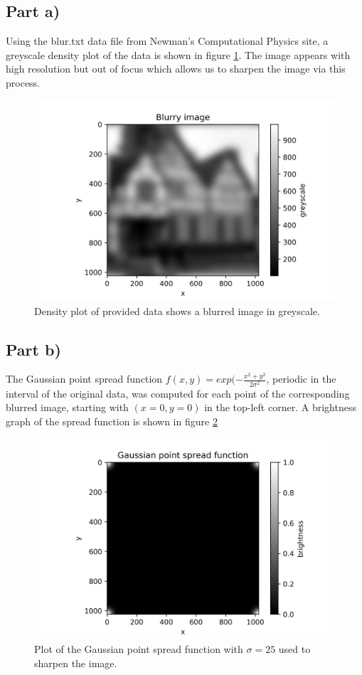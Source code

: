 \documentclass{article}
\begin{document}
\subsection{Part a)}
Using the blur.txt data file from Newman's Computational Physics site, a greyscale density plot of the data is shown in figure \ref{fig:blurred_image}. The image appears with high resolution but out of focus which allows us to sharpen the image via this process.

\begin{figure}[H]
	\centering
	\includegraphics{../images/blurred_image.png}
	\caption{Density plot of provided data shows a blurred image in greyscale.}
	\label{fig:blurred_image}	
\end{figure}

\subsection{Part b)}
The Gaussian point spread function $f(x,y) = exp(-\frac{x^2+y^2}{2\sigma^2}$, periodic in the interval of the original data, was computed for each point of the corresponding blurred image, starting with $(x=0,y=0)$ in the top-left corner. A brightness graph of the spread function is shown in figure \ref{fig:spread_func}

\begin{figure}[H]
	\centering
	\includegraphics{../images/spread_function.png}
	\caption{Plot of the Gaussian point spread function with $\sigma=25$ used to sharpen the image.}
	\label{fig:spread_func}	
\end{figure}
\end{document}
